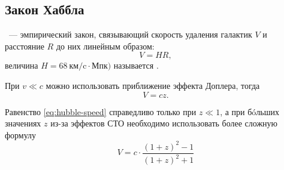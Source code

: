 \subsection{Закон Хаббла}
~--- эмпирический закон, связывающий скорость удаления галактик $V$ и расстояние $R$ до них линейным образом: 
\begin{equation}
	V = H R,
\end{equation}
величина $H=68~\text{км/c} \cdot \text{Мпк})$ называется .

При $v \ll c$ можно использовать приближение эффекта Доплера, тогда
\begin{equation}
	V = c z.
\label{eq:hubble-speed}
\end{equation}

Равенство \eqref{eq:hubble-speed} справедливо только при $z \ll 1$, а при б\'{o}льших значениях $z$ из-за эффектов СТО необходимо использовать более сложную формулу 
\begin{equation}
	V = c \cdot \frac{(1 + z)^2 - 1}{(1 + z)^2 + 1}
\end{equation}